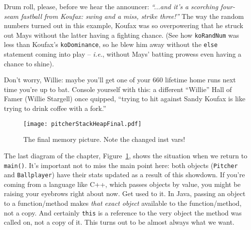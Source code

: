 Drum roll, please, before we hear the announcer: \textit{``...and it's a
scorching four-seam fastball from Koufax: swing and a miss, strike three!''}
The way the random numbers turned out in this example, Koufax was so
overpowering that he struck out Mays without the latter having a fighting
chance. (See how \texttt{koRandNum} was less than Koufax's
\texttt{koDominance}, so he blew him away without the \texttt{else} statement
coming into play -- \textit{i.e.}, without Mays' batting prowess even having a
chance to shine).

Don't worry, Willie: maybe you'll get one of your 660 lifetime home runs next
time you're up to bat. Console yourself with this: a different ``Willie'' Hall
of Famer (Willie Stargell) once quipped, ``trying to hit against Sandy Koufax
is like trying to drink coffee with a fork.''


\begin{figure}
\centering
\texttt{[image: pitcherStackHeapFinal.pdf]}  %
\caption{The final memory picture. Note the changed inst vars!}
\label{fig:pitcherStackHeapFinal}
\end{figure}

The last diagram of the chapter, Figure~\ref{fig:pitcherStackHeapFinal}, shows
the situation when we return to \texttt{main()}. It's important not to miss
the main point here: both objects (\texttt{Pitcher} and \texttt{Ballplayer})
have their stats updated as a result of this showdown. If you're coming from a
language like C++, which passes objects by value, you might be raising your
eyebrows right about now. Get used to it. In Java, passing an object to a
function/method makes \textit{that exact object} available to the
function/method, not a copy. And certainly \texttt{this} is a reference to the
very object the method was called on, not a copy of it. This turns out to be
almost always what we want.


